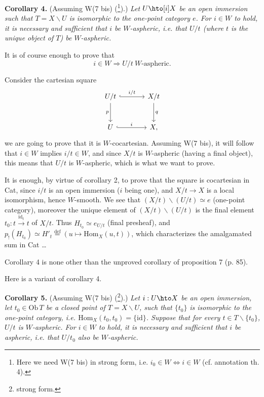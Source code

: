 
\noindent\textbf{Corollary 4.} (Assuming W(7 bis) (\footnote[104]{Here we need W(7 bis) in strong form, i.e. $i_0\in W \iff i\in W$ (cf. annotation th. 4).}).) \textit{Let $U \hto[i] X$ be an open immersion such that $T=X\backslash U$ is isomorphic to the one-point category $e$. For $i\in W$ to hold, it is necessary and sufficient that $i$ be $W$-aspheric, i.e. that $U/t$ (where $t$ is the unique object of $T$) be $W$-aspheric.}

It is of course enough to prove that
\[
i\in W \Longrightarrow U/t \ W\text{-aspheric.}
\]

Consider the cartesian square
\[
\begin{tikzcd}[row sep=large,column sep=large]
U/t \arrow[r, hook, "i/t"] \arrow[d, "p"'] & X/t \arrow[d, "q"] \\
U \arrow[r, hook, "i"] & X,
\end{tikzcd}
\]
we are going to prove that it is $W$-cocartesian. Assuming W(7 bis), it will follow that $i\in W$ implies $i/t\in W$, and since $X/t$ is $W$-aspheric (having a final object), this means that $U/t$ is $W$-aspheric, which is what we want to prove.

It is enough, by virtue of corollary 2, to prove that the square is cocartesian in Cat, since $i/t$ is an open immersion ($i$ being one), and $X/t\longrightarrow X$ is a local isomorphism, hence $W$-smooth. We see that $(X/t)\backslash(U/t)\simeq e$ (one-point category), moreover the unique element of $(X/t)\backslash(U/t)$ is the final element $t_0 : t\xrightarrow{\mathrm{id}_t} t$ of $X/t$. Thus $H_{t_0}\simeq e_{U/t}$ (final presheaf), and $p_{!}(H_{t_0})\simeq H'_t \overset{\text{def}}{=} (u\longmapsto \mathrm{Hom}_X(u,t))$, which characterizes the amalgamated sum in Cat
\dots

Corollary 4 is none other than the unproved corollary of proposition 7 (p. 85).

Here is a variant of corollary 4.

\noindent\textbf{Corollary 5.} (Assuming W(7 bis) (\footnote[105]{strong form.}).) \textit{Let $i : U \hto X$ be an open immersion, let $t_0\in\mathrm{Ob}\,T$ be a \textup{closed} point of $T=X\backslash U$, such that $\{t_0\}$}
\textit{is isomorphic to the one-point category, i.e. $\mathrm{Hom}_X(t_0,t_0)=\{\mathrm{id}\}$. Suppose that for every $t\in T\backslash\{t_0\}$, $U/t$ is $W$-aspheric. For $i\in W$ to hold, it is necessary and sufficient that $i$ be aspheric, i.e. that $U/t_0$ also be $W$-aspheric.}

